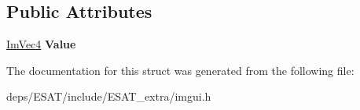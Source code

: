 \subsection*{Public Attributes}
\begin{DoxyCompactItemize}
\item 
\mbox{\label{struct_im_color_a4cf43bd58e30decaa0248f839fc85e95}} 
\mbox{\hyperlink{struct_im_vec4}{Im\+Vec4}} {\bfseries Value}
\end{DoxyCompactItemize}


The documentation for this struct was generated from the following file\+:\begin{DoxyCompactItemize}
\item 
deps/\+E\+S\+A\+T/include/\+E\+S\+A\+T\+\_\+extra/imgui.\+h\end{DoxyCompactItemize}
